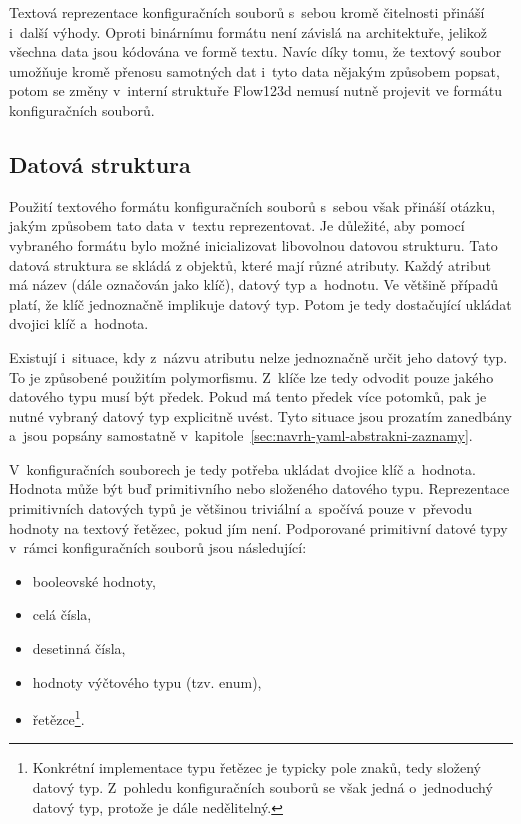 \documentclass[FM,bw,DP]{tulthesis}
\begin{document}
Textová reprezentace konfiguračních souborů s~sebou kromě čitelnosti přináší i~další výhody. Oproti binárnímu formátu není závislá na architektuře, jelikož všechna data jsou kódována ve formě textu. Navíc díky tomu, že textový soubor umožňuje kromě přenosu samotných dat i~tyto data nějakým způsobem popsat, potom se změny v~interní struktuře Flow123d nemusí nutně projevit ve formátu konfiguračních souborů.

\subsection{Datová struktura}
\label{sec:datova-sturktura}
Použití textového formátu konfiguračních souborů s~sebou však přináší otázku, jakým způsobem tato data v~textu reprezentovat. Je důležité, aby pomocí vybraného formátu bylo možné inicializovat libovolnou datovou strukturu. Tato datová struktura se skládá z objektů, které mají různé atributy. Každý atribut má název (dále označován jako klíč), datový typ a~hodnotu. Ve většině případů platí, že klíč jednoznačně implikuje datový typ. Potom je tedy dostačující ukládat dvojici klíč a~hodnota.

Existují i~situace, kdy z~názvu atributu nelze jednoznačně určit jeho datový typ. To je způsobené použitím polymorfismu. Z~klíče lze tedy odvodit pouze jakého datového typu musí být předek. Pokud má tento předek více potomků, pak je nutné vybraný datový typ explicitně uvést. Tyto situace jsou prozatím zanedbány a~jsou popsány samostatně v~kapitole~\ref{sec:navrh-yaml-abstrakni-zaznamy}.

V~konfiguračních souborech je tedy potřeba ukládat dvojice klíč a~hodnota. Hodnota může být buď primitivního nebo složeného datového typu. Reprezentace primitivních datových typů je většinou triviální a~spočívá pouze v~převodu hodnoty na textový řetězec, pokud jím není. Podporované primitivní datové typy v~rámci konfiguračních souborů jsou následující:

\begin{itemize}
	\item booleovské hodnoty, %
	\item celá čísla,
	\item desetinná čísla,
	\item hodnoty výčtového typu (tzv. enum),
	\item řetězce\footnote{Konkrétní implementace typu řetězec je typicky pole znaků, tedy složený datový typ. Z~pohledu konfiguračních souborů se však jedná o~jednoduchý datový typ, protože je dále nedělitelný.}.
\end{itemize}
\end{document}
